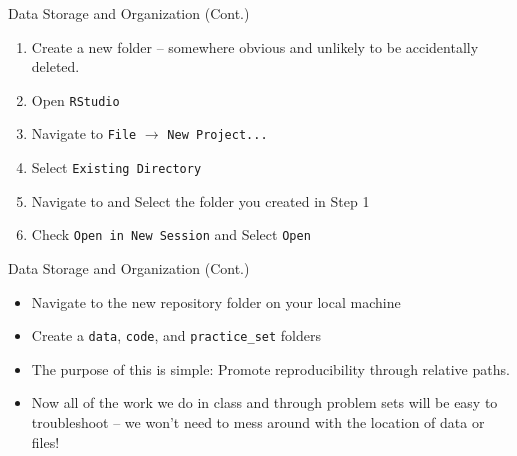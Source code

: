 \documentclass[
  ignorenonframetext,
]{beamer}
\providecommand{\tightlist}{%
  \setlength{\itemsep}{0pt}\setlength{\parskip}{0pt}}
\begin{document}
\begin{frame}{Data Storage and Organization (Cont.)}
\label{data-storage-and-organization-cont.-1}
\begin{enumerate}

\item Create a new folder -- somewhere obvious and unlikely to be accidentally deleted. \par \vspace{1.5mm}

\item Open \texttt{RStudio} \par \vspace{2.5mm}

\item Navigate to \texttt{File} $\rightarrow$ \texttt{New Project...} \par \vspace{1.5mm}

\item Select \texttt{Existing Directory} \par \vspace{1.5mm}

\item Navigate to and Select the folder you created in Step 1 \par \vspace{1.5mm}

\item Check \texttt{Open in New Session} and Select \texttt{Open} \par \vspace{1.5mm}

\end{enumerate}
\end{frame}

\begin{frame}{Data Storage and Organization (Cont.)}
\label{data-storage-and-organization-cont.-2}
\begin{itemize}
\tightlist
\item
  Navigate to the new repository folder on your local machine

  \par \vspace{2.5mm}
\item
  Create a \texttt{data}, \texttt{code}, and \texttt{practice\_set}
  folders

  \par \vspace{2.5mm}
\item
  The purpose of this is simple: Promote reproducibility through
  relative paths.

  \par \vspace{2.5mm}
\item
  Now all of the work we do in class and through problem sets will be
  easy to troubleshoot -- we won't need to mess around with the location
  of data or files!
\end{itemize}
\end{frame}
\end{document}
